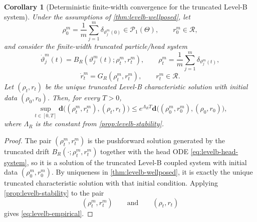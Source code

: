 \documentclass[11pt]{article}
\newtheorem{corollary}[theorem]{Corollary}
\theoremstyle{definition}
\newcommand{\PP}{\mathcal{P}}
\begin{document}
\begin{corollary}[Deterministic finite-width convergence for the truncated Level-B system]
\label{cor:levelb-empirical-limit}
Under the assumptions of \cref{thm:levelb-wellposed}, let
\[
  \rho_0^m=\frac1m\sum_{j=1}^m \delta_{\vartheta_j^m(0)}
  \in \PP_1(\Theta),
  \qquad
  r_0^m\in \mathcal R,
\]
and consider the finite-width truncated particle/head system
\begin{equation}
  \dot \vartheta_j^m(t)
  =
  B_R(\vartheta_j^m(t);\rho_t^m,r_t^m),
  \qquad
  \rho_t^m=\frac1m\sum_{j=1}^m \delta_{\vartheta_j^m(t)},
  \label{eq:levelb-particle-system}
\end{equation}
\begin{equation}
  \dot r_t^m
  =
  G_R(\rho_t^m,r_t^m),
  \qquad
  r_t^m\in \mathcal R.
  \label{eq:levelb-head-system}
\end{equation}
Let $(\rho_t,r_t)$ be the unique truncated Level-B characteristic solution with initial data $(\rho_0,r_0)$.
Then, for every $T>0$,
\begin{equation}
  \sup_{t\in[0,T]}
  \mathbf d\bigl((\rho_t^m,r_t^m),(\rho_t,r_t)\bigr)
  \le
  e^{\Lambda_R T}
  \mathbf d\bigl((\rho_0^m,r_0^m),(\rho_0,r_0)\bigr),
  \label{eq:levelb-empirical}
\end{equation}
where $\Lambda_R$ is the constant from \cref{prop:levelb-stability}.
\end{corollary}

\begin{proof}
The pair $(\rho_t^m,r_t^m)$ is the pushforward solution generated by the truncated drift $B_R(\cdot;\rho_t^m,r_t^m)$ together with the head ODE \eqref{eq:levelb-head-system},
so it is a solution of the truncated Level-B coupled system with initial data $(\rho_0^m,r_0^m)$.
By uniqueness in \cref{thm:levelb-wellposed}, it is exactly the unique truncated characteristic solution with that initial condition.
Applying \cref{prop:levelb-stability} to the pair
\[
  (\rho_t^m,r_t^m)
  \qquad \text{and} \qquad
  (\rho_t,r_t)
\]
gives \eqref{eq:levelb-empirical}.
\end{proof}
\end{document}
